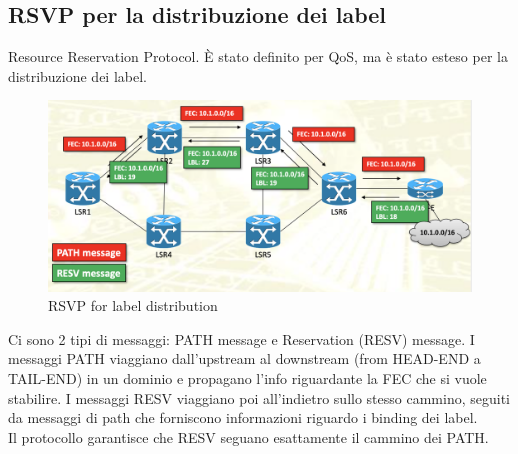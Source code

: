 \documentclass{article}
\begin{document}
\subsection{RSVP per la distribuzione dei label} Resource Reservation Protocol. È stato definito per QoS, ma è stato esteso per la distribuzione dei label. 
\begin{figure}[H]
    \centering
    \includegraphics[scale=0.4]{figures/RSVP label distribution.png}
    \caption{RSVP for label distribution}
\end{figure}
\noindent Ci sono 2 tipi di messaggi: PATH message e Reservation (RESV) message. I messaggi PATH viaggiano dall'upstream al downstream (from HEAD-END a TAIL-END) in un dominio e propagano l'info riguardante la FEC che si vuole stabilire. I messaggi RESV viaggiano poi all'indietro sullo stesso cammino, seguiti da messaggi di path che forniscono informazioni riguardo i binding dei label. \\ Il protocollo garantisce che RESV seguano esattamente il cammino dei PATH.
\end{document}
